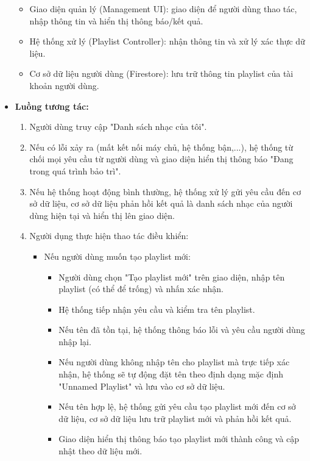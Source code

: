 \documentclass[a4paper]{article}
\begin{document}
\begin{itemize}
\begin{itemize}
		      \item Giao diện quản lý (Management UI): giao diện để người dùng thao tác, nhập thông tin và hiển thị thông báo/kết quả.
		      \item Hệ thống xử lý (Playlist Controller): nhận thông tin và xử lý xác thực dữ liệu.
		      \item Cơ sở dữ liệu người dùng (Firestore): lưu trữ thông tin playlist của tài khoản người dùng.
	      \end{itemize}
	\item \textbf{Luồng tương tác:}
	      \begin{enumerate}
		      \item Người dùng truy cập "Danh sách nhạc của tôi".
          \item Nếu có lỗi xảy ra (mất kết nối máy chủ, hệ thống bận,...), hệ thống từ chối mọi yêu cầu từ người dùng và giao diện hiển thị thông báo "Đang trong quá trình bảo trì".
		      \item Nếu hệ thống hoạt động bình thường, hệ thống xử lý gửi yêu cầu đến cơ sở dữ liệu, cơ sở dữ liệu phản hồi kết quả là danh sách nhạc của người dùng hiện tại và hiển thị lên giao diện.
		      \item Người dụng thực hiện thao tác điều khiển:
		            \begin{itemize}
			            \item Nếu người dùng muốn tạo playlist mới:
			                  \begin{itemize}
				                  \item Người dùng chọn "Tạo playlist mới" trên giao diện, nhập tên playlist (có thể để trống) và nhấn xác nhận.
				                  \item Hệ thống tiếp nhận yêu cầu và kiểm tra tên playlist.
				                  \item Nếu tên đã tồn tại, hệ thống thông báo lỗi và yêu cầu người dùng nhập lại.
				                  \item Nếu người dùng không nhập tên cho playlist mà trực tiếp xác nhận, hệ thống sẽ tự động đặt tên theo định dạng mặc định "Unnamed Playlist" và lưu vào cơ sở dữ liệu.
				                  \item Nếu tên hợp lệ, hệ thống gửi yêu cầu tạo playlist mới đến cơ sở dữ liệu, cơ sở dữ liệu lưu trữ playlist mới và phản hồi kết quả.
				                  \item Giao diện hiển thị thông báo tạo playlist mới thành công và cập nhật theo dữ liệu mới.
			                  \end{itemize}

\end{itemize}
\end{enumerate}
\end{itemize}
\end{document}
